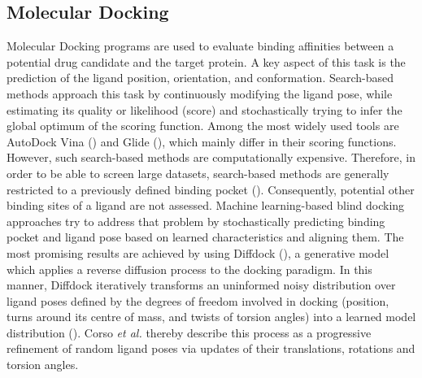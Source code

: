 \documentclass[11pt, letterpaper, titlepage]{article}
\renewcommand{\cite}{\parencite}
\begin{document}
\subsection{Molecular Docking}
Molecular Docking programs are used to evaluate binding affinities between a potential drug candidate and the target protein. A key aspect of this task is the prediction of the ligand position, orientation, and conformation. Search-based methods approach this task by continuously modifying the ligand pose, while estimating its quality or likelihood (score) and stochastically trying to infer the global optimum of the scoring function. Among the most widely used tools are AutoDock Vina (\cite{Trott.2010}) and Glide (\cite{Halgren.2004}), which mainly differ in their scoring functions. However, such search-based methods are computationally expensive. Therefore, in order to be able to screen large datasets, search-based methods are generally restricted to a previously defined binding pocket (\cite{Corso.2022}). Consequently, potential other binding sites of a ligand are not assessed. Machine learning-based blind docking approaches try to address that problem by stochastically predicting binding pocket and ligand pose based on learned characteristics and aligning them. The most promising results are achieved by using Diffdock (\cite{Corso.2022}), a generative model which applies a reverse diffusion process to the docking paradigm. In this manner, Diffdock iteratively transforms an uninformed noisy distribution over ligand poses defined by the degrees of freedom involved in docking (position, turns around its centre of mass, and twists of torsion angles) into a learned model distribution (\cite{Corso.2022}). Corso \textit{et al.} thereby describe this process as a progressive refinement of random ligand poses via updates of their translations, rotations and torsion angles.

\end{document}
